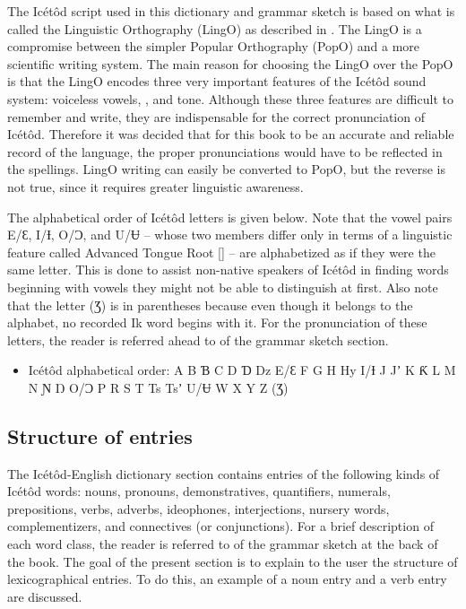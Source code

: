 The Icétôd script used in this dictionary and grammar sketch is based on what is called the Linguistic Orthography (LingO) as described in \citet{Schrock2015}. The LingO is a compromise between the simpler Popular Orthography (PopO) and a more scientific writing system. The main reason for choosing the LingO over the PopO is that the LingO encodes three very important features of the Icétôd sound system: voiceless vowels, , and tone. Although these three features are difficult to remember and write, they are indispensable for the correct pronunciation of Icétôd. Therefore it was decided that for this book to be an accurate and reliable record of the language, the proper pronunciations would have to be reflected in the spellings. LingO writing can easily be converted to PopO, but the reverse is not true, since it requires greater linguistic awareness.

The alphabetical order of Icétôd letters is given below. Note that the vowel pairs E/Ɛ, I/Ɨ, O/Ɔ, and U/Ʉ – whose two members differ only in terms of a linguistic feature called Advanced Tongue Root [] – are alphabetized as if they were the same letter. This is done to assist non-native speakers of Icétôd in finding words beginning with vowels they might not be able to distinguish at first. Also note that the letter (Ʒ) is in parentheses because even though it belongs to the alphabet, no recorded Ik word begins with it. For the pronunciation of these letters, the reader is referred ahead to  of the grammar sketch section.
 
\begin{itemize}
\item  Icétôd alphabetical order: A B Ɓ C D Ɗ Dz E/Ɛ F G H Hy I/Ɨ J Jʼ K Ƙ L M N Ɲ Ŋ O/Ɔ P R S T Ts Tsʼ U/Ʉ W X Y Z (Ʒ)
\end{itemize}
 
\subsection{Structure of entries}\label{sec:1.3.2}

The Icétôd-English dictionary section contains entries of the following kinds of Icétôd words\textsc{:} nouns, pronouns, demonstratives, quantifiers, numerals, prepositions, verbs, adverbs, ideophones, interjections, nursery words, complementizers, and connectives (or conjunctions). For a brief description of each word class, the reader is referred to  of the grammar sketch at the back of the book. The goal of the present section is to explain to the user the structure of lexicographical entries. To do this, an example of a noun entry and a verb entry are discussed.

